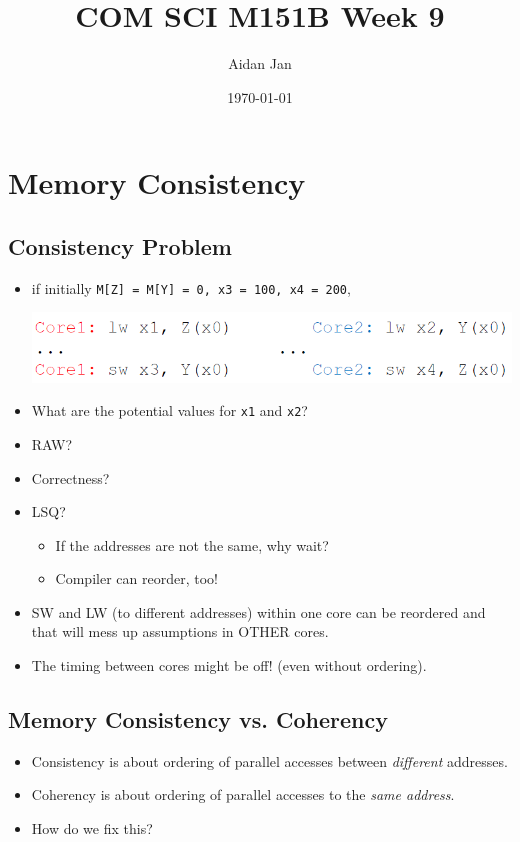 \documentclass[10pt]{article}
\title{COM SCI M151B Week 9}
\author{Aidan Jan}
\date{\today}
\begin{document}
\maketitle

\section*{Memory Consistency}
\subsection*{Consistency Problem}
\begin{itemize}
    \item if initially \texttt{M[Z] = M[Y] = 0, x3 = 100, x4 = 200},
    \begin{center}
        \includegraphics*[scale=0.8]{W9_1.png}
    \end{center}
    \item What are the potential values for \texttt{x1} and \texttt{x2}?
    \item RAW?
    \item Correctness?
    \item LSQ?
    \begin{itemize}
        \item If the addresses are not the same, why wait?
        \item Compiler can reorder, too!
    \end{itemize}
    \item SW and LW (to different addresses) within one core can be reordered and that will mess up assumptions in OTHER cores.
    \item The timing between cores might be off! (even without ordering).
\end{itemize}

\subsection*{Memory Consistency vs. Coherency}
\begin{itemize}
    \item Consistency is about ordering of parallel accesses between \textit{different} addresses.
    \item Coherency is about ordering of parallel accesses to the \textit{same address}.
    \item How do we fix this?
\end{itemize}
\end{document}
